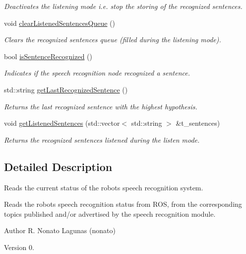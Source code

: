 \begin{DoxyCompactItemize}
\begin{DoxyCompactList}\small\item\em Deactivates the listening mode i.\+e. stop the storing of the recognized sentences. \end{DoxyCompactList}\item 
void \hyperlink{class_speech_recognition_status_a6cb03e02b0b474d9361a4b546c2c103a}{clear\+Listened\+Sentences\+Queue} ()
\begin{DoxyCompactList}\small\item\em Clears the recognized sentences queue (filled during the listening mode). \end{DoxyCompactList}\item 
bool \hyperlink{class_speech_recognition_status_a03c24687f9e2e3de3288634b178829ac}{is\+Sentence\+Recognized} ()
\begin{DoxyCompactList}\small\item\em Indicates if the speech recognition node recognized a sentence. \end{DoxyCompactList}\item 
std\+::string \hyperlink{class_speech_recognition_status_a2d8314b8cc6725021c956c2c619b8b98}{get\+Last\+Recognized\+Sentence} ()
\begin{DoxyCompactList}\small\item\em Returns the last recognized sentence with the highest hypothesis. \end{DoxyCompactList}\item 
void \hyperlink{class_speech_recognition_status_a7650559297b97708d9cecfa9b68bd89d}{get\+Listened\+Sentences} (std\+::vector$<$ std\+::string $>$ \&t\+\_\+sentences)
\begin{DoxyCompactList}\small\item\em Returns the recognized sentences listened during the listen mode. \end{DoxyCompactList}\end{DoxyCompactItemize}


\subsection{Detailed Description}
Reads the current status of the robot\textquotesingle{}s speech recognition system. 

Reads the robot\textquotesingle{}s speech recognition status from R\+OS, from the corresponding topics published and/or advertised by the speech recognition module.

\begin{DoxyAuthor}{Author}
R. Nonato Lagunas (nonato) 
\end{DoxyAuthor}
\begin{DoxyVersion}{Version}
0. 
\end{DoxyVersion}


